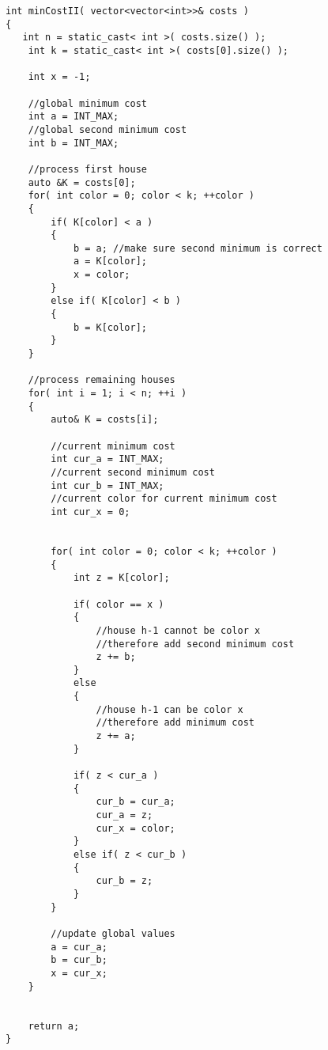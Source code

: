 \setcounter{lstlisting}{0}
\begin{lstlisting}[style=customc, caption={Dynamic Programming}]
int minCostII( vector<vector<int>>& costs )
{
   int n = static_cast< int >( costs.size() );
    int k = static_cast< int >( costs[0].size() );

    int x = -1;

    //global minimum cost
    int a = INT_MAX;
    //global second minimum cost
    int b = INT_MAX;

    //process first house
    auto &K = costs[0];
    for( int color = 0; color < k; ++color )
    {
        if( K[color] < a )
        {
            b = a; //make sure second minimum is correct
            a = K[color];
            x = color;
        }
        else if( K[color] < b )
        {
            b = K[color];
        }
    }

    //process remaining houses
    for( int i = 1; i < n; ++i )
    {
        auto& K = costs[i];

        //current minimum cost
        int cur_a = INT_MAX;
        //current second minimum cost
        int cur_b = INT_MAX;
        //current color for current minimum cost
        int cur_x = 0;


        for( int color = 0; color < k; ++color )
        {
            int z = K[color];

            if( color == x )
            {
                //house h-1 cannot be color x
                //therefore add second minimum cost
                z += b;
            }
            else
            {
                //house h-1 can be color x
                //therefore add minimum cost
                z += a;
            }

            if( z < cur_a )
            {
                cur_b = cur_a;
                cur_a = z;
                cur_x = color;
            }
            else if( z < cur_b )
            {
                cur_b = z;
            }
        }

        //update global values
        a = cur_a;
        b = cur_b;
        x = cur_x;
    }


    return a;
}
\end{lstlisting}